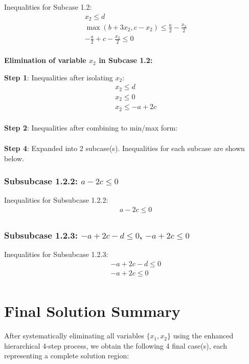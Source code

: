\documentclass{article}
\begin{document}
Inequalities for Subcase 1.2:
\begin{align}
& x_{2} \leq d \\
& \max\left(b + 3 x_{2}, c - x_{2}\right) \leq \frac{a}{2} - \frac{x_{2}}{2} \\
& - \frac{a}{2} + c - \frac{x_{2}}{2} \leq 0 \\
\end{align}

\textbf{Elimination of variable $x_{2}$ in Subcase 1.2:}

\textbf{Step 1}: Inequalities after isolating $x_{2}$:
\begin{align}
& x_{2} \leq d \\
& x_{2} \leq 0 \\
& x_{2} \leq - a + 2 c \\
\end{align}

\textbf{Step 2}: Inequalities after combining to min/max form:
\begin{align}
\end{align}

\textbf{Step 4}: Expanded into 2 subcase(s). Inequalities for each subcase are shown below.

\subsubsection{Subsubcase 1.2.2: $a - 2 c \leq 0$}

Inequalities for Subsubcase 1.2.2:
\begin{align}
& a - 2 c \leq 0 \\
\end{align}

\subsubsection{Subsubcase 1.2.3: $- a + 2 c - d \leq 0$, $- a + 2 c \leq 0$}

Inequalities for Subsubcase 1.2.3:
\begin{align}
& - a + 2 c - d \leq 0 \\
& - a + 2 c \leq 0 \\
\end{align}

\section{Final Solution Summary}

After systematically eliminating all variables $\{x_{1}, x_{2}\}$
using the enhanced hierarchical 4-step process, we obtain the following
4 final case(s), each representing a complete solution region:
\end{document}
